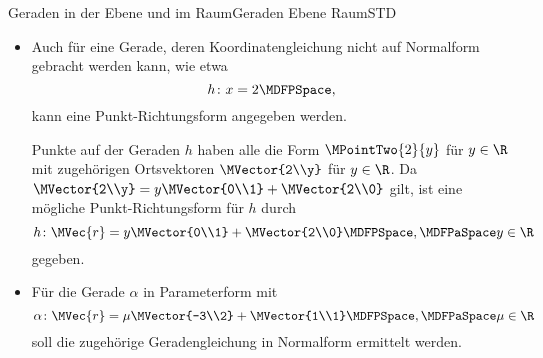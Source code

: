 \begin{MXContent}{Geraden in der Ebene und im Raum}{Geraden Ebene Raum}{STD}
\begin{MExample}
\begin{itemize}
 Zunächst wird die Geradengleichung auf Normalform gebracht:
 \[
  2y-3x=6\MDFPaSpace\Leftrightarrow\MDFPaSpace y=\frac{3}{2}x+3 \MDFPeriod
 \]
 Punkte auf $g$ haben also die Form $\MPointTwo[\Big]{x}{\frac{3}{2}x+3}$ mit $x\in\R$, welche durch Ortsvektoren $\MVector{x\\\frac{3}{2}x+3}$ mit $x\in\R$ beschrieben werden. Folglich ist eine mögliche Parameterform durch
 \[
  g\colon \MVec{r}=x\MVector{1\\\frac{3}{2}}+\MVector{0\\3}\MDFPSpace,\MDFPaSpace x\in\R
 \]
 gegeben. Für eine andere Parameterform können ein beliebiger anderer Richtungsvektor, der kollinear zu $\MVector{1\\\frac{3}{2}}$ ist, und ein beliebiger anderer Aufpunkt auf $g$ gewählt werden. Zum Beispiel ist $\MVector{2\\3}$ kollinear zu $\MVector{1\\\frac{3}{2}}$, da $\MVector{2\\3}=2\MVector{1\\\frac{3}{2}}$ gilt. Und $\MVector{2\\6}$ ist ein anderer passender Aufpunktvektor, da der Punkt $\MPointTwo{2}{6}$ offenbar die Geradengleichung erfüllt. Folglich ist 
 \[
  g\colon \MVec{r}=\sigma\MVector{2\\3}+\MVector{2\\6}\MDFPSpace,\MDFPaSpace \sigma\in\R
 \]
 eine weitere mögliche Parameterform der Geraden $g$.
 \item Auch für eine Gerade, deren Koordinatengleichung nicht auf Normalform gebracht werden kann, wie etwa
 \[
  h\colon x=2 \MDFPSpace,
 \]
 kann eine Punkt-Richtungsform angegeben werden.
 
 Punkte auf der Geraden $h$ haben alle die Form $\MPointTwo{2}{y}$ für $y\in\R$ mit zugehörigen Ortsvektoren $\MVector{2\\y}$ für $y\in\R$. Da $\MVector{2\\y}=y\MVector{0\\1}+\MVector{2\\0}$ gilt, ist eine mögliche Punkt-Richtungsform für $h$ durch
 \[
  h\colon \MVec{r}=y\MVector{0\\1}+\MVector{2\\0}\MDFPSpace,\MDFPaSpace y\in\R
 \]
 gegeben.
 \item Für die Gerade $\alpha$ in Parameterform mit
 \[
  \alpha\colon \MVec{r}=\mu\MVector{-3\\2} + \MVector{1\\1}\MDFPSpace,\MDFPaSpace \mu\in\R
 \]
 soll die zugehörige Geradengleichung in Normalform ermittelt werden.
 

\end{itemize}
\end{MExample}
\end{MXContent}
